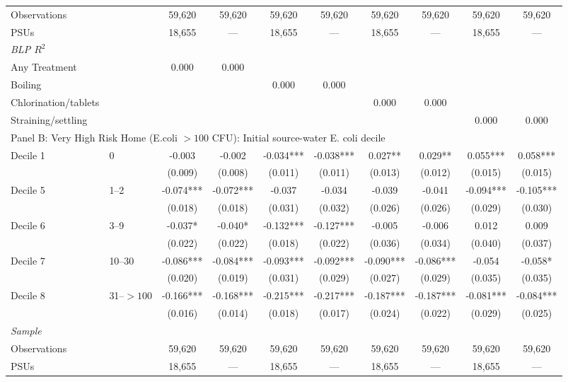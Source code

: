 \begin{landscape}
\begin{table}[p]
\begin{adjustbox}{max width=\linewidth, center}
\begin{tabular}{llcccccccc}
\quad Observations &  & 59,620 & 59,620 & 59,620 & 59,620 & 59,620 & 59,620 & 59,620 & 59,620 \\
\quad PSUs &  & 18,655 & --- & 18,655 & --- & 18,655 & --- & 18,655 & --- \\
\multicolumn{10}{l}{\textit{BLP $R^{2}$}} \\
\quad Any Treatment &  & 0.000 & 0.000 &  &  &  &  &  &  \\
\quad Boiling &  &  &  & 0.000 & 0.000 &  &  &  &  \\
\quad Chlorination/tablets &  &  &  &  &  & 0.000 & 0.000 &  &  \\
\quad Straining/settling &  &  &  &  &  &  &  & 0.000 & 0.000 \\
\midrule
\multicolumn{10}{l}{Panel B: Very High Risk Home (E.coli $>100$ CFU): Initial source-water E. coli decile} \\
Decile 1 & 0 & -0.003 & -0.002 & -0.034*** & -0.038*** & 0.027** & 0.029** & 0.055*** & 0.058*** \\
 &  & (0.009) & (0.008) & (0.011) & (0.011) & (0.013) & (0.012) & (0.015) & (0.015) \\
Decile 5 & 1--2 & -0.074*** & -0.072*** & -0.037 & -0.034 & -0.039 & -0.041 & -0.094*** & -0.105*** \\
 &  & (0.018) & (0.018) & (0.031) & (0.032) & (0.026) & (0.026) & (0.029) & (0.030) \\
Decile 6 & 3--9 & -0.037* & -0.040* & -0.132*** & -0.127*** & -0.005 & -0.006 & 0.012 & 0.009 \\
 &  & (0.022) & (0.022) & (0.018) & (0.022) & (0.036) & (0.034) & (0.040) & (0.037) \\
Decile 7 & 10--30 & -0.086*** & -0.084*** & -0.093*** & -0.092*** & -0.090*** & -0.086*** & -0.054 & -0.058* \\
 &  & (0.020) & (0.019) & (0.031) & (0.029) & (0.027) & (0.029) & (0.035) & (0.035) \\
Decile 8 & 31--$>100$ & -0.166*** & -0.168*** & -0.215*** & -0.217*** & -0.187*** & -0.187*** & -0.081*** & -0.084*** \\
 &  & (0.016) & (0.014) & (0.018) & (0.017) & (0.024) & (0.022) & (0.029) & (0.025) \\
\multicolumn{10}{l}{\textit{Sample}} \\
\quad Observations &  & 59,620 & 59,620 & 59,620 & 59,620 & 59,620 & 59,620 & 59,620 & 59,620 \\
\quad PSUs &  & 18,655 & --- & 18,655 & --- & 18,655 & --- & 18,655 & --- \\

\end{tabular}
\end{adjustbox}
\end{table}
\end{landscape}
